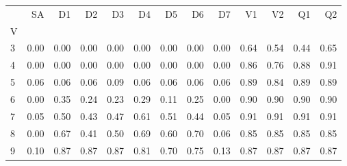 \begin{tabular}{lrrrrrrrrrrrr}
\toprule
{} &   SA &   D1 &   D2 &   D3 &   D4 &   D5 &   D6 &   D7 &   V1 &   V2 &   Q1 &   Q2 \\
V &      &      &      &      &      &      &      &      &      &      &      &      \\
\midrule
3 & 0.00 & 0.00 & 0.00 & 0.00 & 0.00 & 0.00 & 0.00 & 0.00 & 0.64 & 0.54 & 0.44 & 0.65 \\
4 & 0.00 & 0.00 & 0.00 & 0.00 & 0.00 & 0.00 & 0.00 & 0.00 & 0.86 & 0.76 & 0.88 & 0.91 \\
5 & 0.06 & 0.06 & 0.06 & 0.09 & 0.06 & 0.06 & 0.06 & 0.06 & 0.89 & 0.84 & 0.89 & 0.89 \\
6 & 0.00 & 0.35 & 0.24 & 0.23 & 0.29 & 0.11 & 0.25 & 0.00 & 0.90 & 0.90 & 0.90 & 0.90 \\
7 & 0.05 & 0.50 & 0.43 & 0.47 & 0.61 & 0.51 & 0.44 & 0.05 & 0.91 & 0.91 & 0.91 & 0.91 \\
8 & 0.00 & 0.67 & 0.41 & 0.50 & 0.69 & 0.60 & 0.70 & 0.06 & 0.85 & 0.85 & 0.85 & 0.85 \\
9 & 0.10 & 0.87 & 0.87 & 0.87 & 0.81 & 0.70 & 0.75 & 0.13 & 0.87 & 0.87 & 0.87 & 0.87 \\
\bottomrule
\end{tabular}
